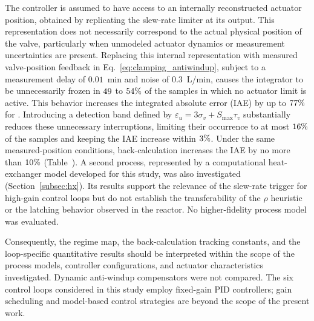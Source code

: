 The controller is assumed to have access to an internally reconstructed actuator position, obtained by replicating the slew-rate limiter at its output. This representation does not necessarily correspond to the actual physical position of the valve, particularly when unmodeled actuator dynamics or measurement uncertainties are present. Replacing this internal representation with measured valve-position feedback in Eq.~\eqref{eq:clamping_antiwindup}, subject to a measurement delay of $0.01$~min and noise of $0.3$~L/min, causes the integrator to be unnecessarily frozen in $49$ to $54\%$ of the samples in which no actuator limit is active. This behavior increases the integrated absolute error (IAE) by up to $77\%$ for \vposworstloop{}. Introducing a detection band defined by $\varepsilon_u = 3\sigma_v + S_{\max}\tau_v$ substantially reduces these unnecessary interruptions, limiting their occurrence to at most $16\%$ of the samples and keeping the IAE increase within $3\%$. Under the same measured-position conditions, back-calculation increases the IAE by no more than $10\%$ (Table~). A second process, represented by a computational heat-exchanger model developed for this study, was also investigated (Section~\ref{subsec:hx}). Its results support the relevance of the slew-rate trigger for high-gain control loops but do not establish the transferability of the $\rho$ heuristic or the latching behavior observed in the reactor. No higher-fidelity process model was evaluated.

Consequently, the regime map, the back-calculation tracking constants, and the loop-specific quantitative results should be interpreted within the scope of the process models, controller configurations, and actuator characteristics investigated. Dynamic anti-windup compensators were not compared. The six control loops considered in this study employ fixed-gain PID controllers; gain scheduling and model-based control strategies are beyond the scope of the present work.
